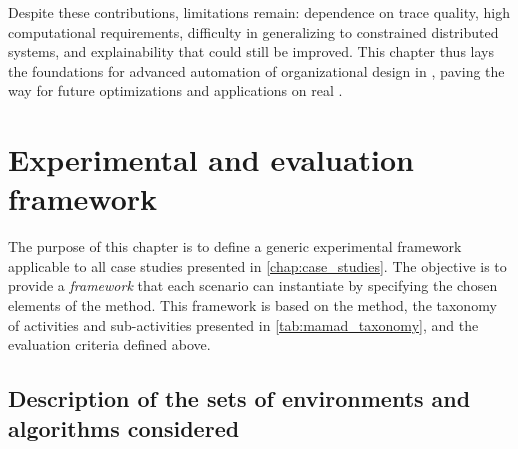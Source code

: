 Despite these contributions, limitations remain: dependence on trace quality, high computational requirements, difficulty in generalizing to constrained distributed systems, and explainability that could still be improved. This chapter thus lays the foundations for advanced automation of organizational design in , paving the way for future optimizations and applications on real .


\clearpage
\thispagestyle{empty}
\null
\newpage


\chapter{Experimental and evaluation framework}
\label{chap:experimental_framework}

The purpose of this chapter is to define a generic experimental framework applicable to all case studies presented in \autoref{chap:case_studies}. The objective is to provide a \textit{framework} that each scenario can instantiate by specifying the chosen elements of the  method. This framework is based on the  method, the taxonomy of activities and sub-activities presented in \autoref{tab:mamad_taxonomy}, and the evaluation criteria defined above.

\section{Description of the sets of environments and algorithms considered}


